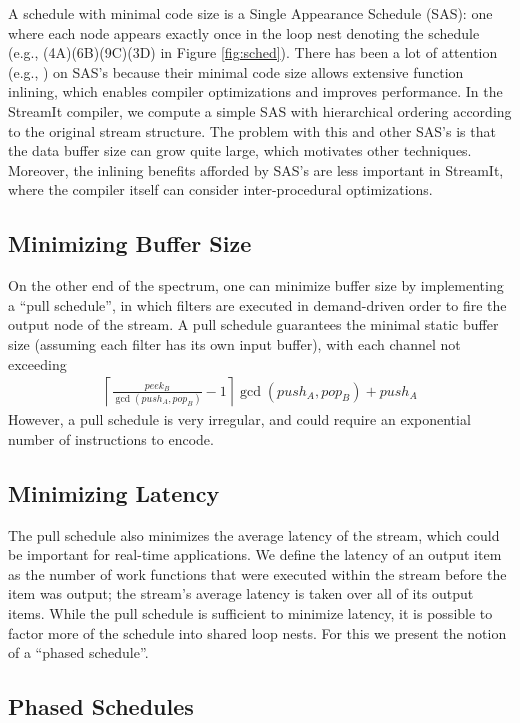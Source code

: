 A schedule with minimal code size is a Single Appearance Schedule
(SAS): one where each node appears exactly once in the loop nest
denoting the schedule (e.g., (4A)(6B)(9C)(3D) in Figure
\ref{fig:sched}).  There has been a lot of attention (e.g.,
\cite{bhattamurtlee97, leesdf}) on SAS's because their minimal code
size allows extensive function inlining, which enables compiler
optimizations and improves performance.  In the StreamIt compiler, we
compute a simple SAS with hierarchical ordering according to the
original stream structure.  The problem with this and other SAS's is
that the data buffer size can grow quite large, which motivates other
techniques.  Moreover, the inlining benefits afforded by SAS's are
less important in StreamIt, where the compiler itself can consider
inter-procedural optimizations.

\subsection{Minimizing Buffer Size}

On the other end of the spectrum, one can minimize buffer size by
implementing a ``pull schedule'', in which filters are executed in
demand-driven order to fire the output node of the stream.  A pull
schedule guarantees the minimal static buffer size (assuming each
filter has its own input buffer), with each channel not exceeding
\begin{align*}
\left\lceil {\frac{peek_B}{\gcd{(push_A, pop_B)}} - 1} \right\rceil
\gcd{(push_A, pop_B)} + push_A
\end{align*}
However, a pull schedule is very irregular, and could require an
exponential number of instructions to encode.

\subsection{Minimizing Latency}

The pull schedule also minimizes the average latency of the stream,
which could be important for real-time applications.  We define the
latency of an output item as the number of work functions that were
executed within the stream before the item was output; the stream's
average latency is taken over all of its output items.  While the pull
schedule is sufficient to minimize latency, it is possible to factor
more of the schedule into shared loop nests.  For this we present the
notion of a ``phased schedule''.

\subsection{Phased Schedules}

